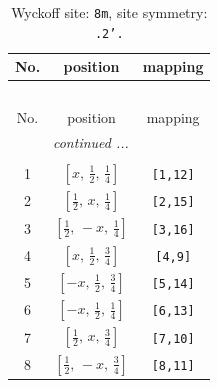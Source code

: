 \documentclass[fleqn,8pt]{jsarticle}
\begin{document}
\begin{longtable}{ccc}
\caption{Wyckoff site: {\tt 8m}, site symmetry: {\tt .2'.}}
 \\
 \hline \hline
No. & position & mapping \\ \hline \endfirsthead

\multicolumn{2}{l}{\tablename\ \thetable{}} \\
 \hline \hline
No. & position & mapping \\ \hline \endhead

 \hline \hline
\multicolumn{2}{r}{\footnotesize\it continued ...} \\ \endfoot

 \hline \hline
\multicolumn{2}{r}{} \\ \endlastfoot

1 & $\left[ x,\, \frac{1}{2},\, \frac{1}{4} \right]$ & {\tt [1,12]} \\ \hline
2 & $\left[ \frac{1}{2},\, x,\, \frac{1}{4} \right]$ & {\tt [2,15]} \\ \hline
3 & $\left[ \frac{1}{2},\, - x,\, \frac{1}{4} \right]$ & {\tt [3,16]} \\ \hline
4 & $\left[ x,\, \frac{1}{2},\, \frac{3}{4} \right]$ & {\tt [4,9]} \\ \hline
5 & $\left[ - x,\, \frac{1}{2},\, \frac{3}{4} \right]$ & {\tt [5,14]} \\ \hline
6 & $\left[ - x,\, \frac{1}{2},\, \frac{1}{4} \right]$ & {\tt [6,13]} \\ \hline
7 & $\left[ \frac{1}{2},\, x,\, \frac{3}{4} \right]$ & {\tt [7,10]} \\ \hline
8 & $\left[ \frac{1}{2},\, - x,\, \frac{3}{4} \right]$ & {\tt [8,11]} \\
\end{longtable}
\renewcommand{\arraystretch}{1.2}
\end{document}
